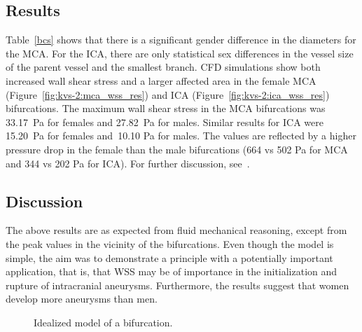\subsection{Results}

Table~\ref{bcs} shows that there is a significant gender difference in
the diameters for the MCA. For the ICA, there are only statistical sex
differences in the vessel size of the parent vessel and the smallest
branch. CFD simulations show both increased wall shear stress and a
larger affected area in the female MCA
(Figure~\ref{fig:kvs-2:mca_wss_res}) and ICA
(Figure~\ref{fig:kvs-2:ica_wss_res}) bifurcations. The maximum wall
shear stress in the MCA bifurcations was 33.17~Pa for females and
27.82~Pa for males. Similar results for ICA were 15.20~Pa for females
and~10.10 Pa for males. The values are reflected by a higher pressure
drop in the female than the male bifurcations (664 vs 502 Pa for MCA
and 344 vs 202 Pa for ICA). For further discussion,
see~\citet{LindekleivValen-SendstadMorganEtAl2010}.

\subsection{Discussion}

The above results are as expected from fluid mechanical reasoning,
except from the peak values in the vicinity of the bifurcations. Even
though the model is simple, the aim was to demonstrate a principle
with a potentially important application, that is, that WSS may be of
importance in the initialization and rupture of intracranial
aneurysms. Furthermore, the results suggest that women develop more
aneurysms than men.

\begin{figure}
  \begin{center}
  \end{center}
  \caption{Idealized model of a bifurcation.}
\end{figure}


